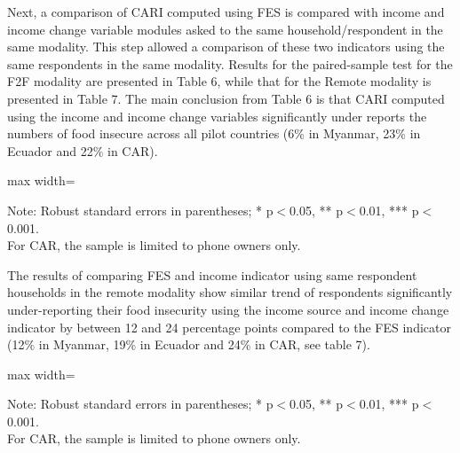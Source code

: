 \documentclass[11pt,harvard]{article}
\begin{document}
Next, a comparison of CARI computed using FES is compared with income and income change variable modules asked to the same household/respondent in the same modality. This step allowed a comparison of these two indicators using the same respondents in the same modality. Results for the paired-sample test for the F2F modality are presented in Table 6, while that for the Remote modality is presented in Table 7. The main conclusion from Table 6 is that CARI computed using the income and income change variables significantly under reports the numbers of food insecure across all pilot countries (6\% in Myanmar, 23\% in Ecuador and 22\% in CAR). 
	
	
	\begin{table}[htbp]
		\centering
		\begin{adjustbox}{max width=\textwidth}
			\begin{threeparttable}
				\caption{CARI: FES vs Income Indicators - Paired Responses (F2F Surveys)}
				\scriptsize
				 
				\label{tab:Paired_F2F_CARI_FES_INC_All_Country}
				\begin{tablenotes}
					\item Note: Robust standard errors in parentheses; * p$<$0.05, ** p$<$0.01, *** p$<$0.001. \\
					For CAR, the sample is limited to phone owners only.
				\end{tablenotes}
			\end{threeparttable}
		\end{adjustbox}
	\end{table}
	
	
The results of comparing FES and income indicator using same respondent households in the remote modality show similar trend of respondents significantly under-reporting their food insecurity using the income source and income change indicator by between 12 and 24 percentage points compared to the FES indicator (12\% in Myanmar, 19\% in Ecuador and 24\% in CAR, see table 7). 
	
	
	\begin{table}[htbp]
		\centering
		\begin{adjustbox}{max width=\textwidth}
			\begin{threeparttable}
				\caption{rCARI: FES vs. Income - Paired Reponses (Remote Surveys)}
				\scriptsize
				 
				\label{tab:Paired_RM_rCARI_FES_INC_All_Country}
				\begin{tablenotes}
					\item Note: Robust standard errors in parentheses; * p$<$0.05, ** p$<$0.01, *** p$<$0.001. \\
					For CAR, the sample is limited to phone owners only.
				\end{tablenotes}
			\end{threeparttable}
		\end{adjustbox}
	\end{table}
	
\end{document}
